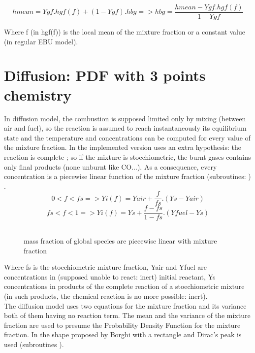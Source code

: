 \begin{equation}
hmean = Ygf.hgf(f) + (1-Ygf).hbg => hbg
= \frac{hmean-Ygf.hgf(f)}{1-Ygf}
\end{equation}

Where f ({\small in hgf(f)}) is the local mean of the mixture fraction
or a constant value ({\small in regular EBU model}).

\section{Diffusion: PDF with 3 points chemistry}

In diffusion model, the combustion is supposed limited only by mixing
({\small between air and fuel}), so the reaction is assumed to reach
instantaneously its equilibrium state and the temperature and
concentrations can be computed for every value of the mixture
fraction. In \CS the implemented version uses an extra hypothesis:
the reaction is complete ; so if the mixture is stoechiometric, the
burnt gases contains only final products ({\small none unburnt like
CO...}). As a consequence, every concentration is a piecewise linear
function of the mixture fraction (subroutines: ) .\\
\begin{equation}
0<f<fs => Yi(f) = Yair + \frac{f}{fs} . (Ys-Yair)
\end{equation}
\begin{equation}
fs<f<1 => Yi(f) = Ys + \frac{f-fs}{1-fs} . (Yfuel-Ys)
\end{equation}\\
\begin{figure}[h]
\caption{mass fraction of global species are piecewise linear with mixture fraction}
\end{figure}
Where fs is the stoechiometric mixture fraction, Yair and Yfuel are
concentrations in ({\small supposed unable to react: inert}) initial
reactant, Ys concentrations in products of the complete reaction of a
stoechiometric mixture ({\small in such products, the chemical
reaction is no more possible: inert}).\\

The diffusion model uses two equations for the mixture fraction and
its variance both of them having no reaction term. The mean and the
variance of the mixture fraction are used to presume the Probability
Density Function for the mixture fraction. In \CS the shape proposed
by Borghi \cite{4} with a rectangle and Dirac's peak is used
(subroutines ).\\

